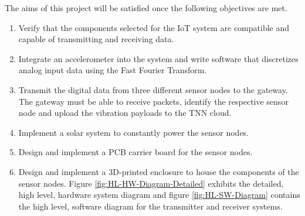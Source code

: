 The aims of this project will be satisfied once the following objectives are met.
\begin{enumerate}
\item Verify that the components selected for the IoT system are compatible and capable of transmitting and receiving data. 
\item Integrate an accelerometer into the system and write software that discretizes analog input data using the Fast Fourier Transform. 
\item Transmit the digital data from three different sensor nodes to the gateway. The gateway must be able to receive packets, identify the respective sensor node and upload the vibration payloads to the TNN cloud. 
\item Implement a solar system to constantly power the sensor nodes.
\item Design and implement a PCB carrier board for the sensor nodes.
\item Design and implement a 3D-printed enclosure to house the components of the sensor nodes. Figure \ref{fig:HL-HW-Diagram-Detailed} exhibits the detailed, high level, hardware system diagram and figure \ref{fig:HL-SW-Diagram} contains the high level, software diagram for the transmitter and receiver systems. 
\end{enumerate}

